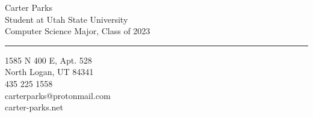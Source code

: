 \documentclass[12pt]{article}
\begin{document}
\sffamily

\begin{multicols}{2}
{ \Huge Carter Parks}\\

{\color{mainGray}
Student at Utah State University\\
Computer Science Major, Class of 2023
}
\vspace{14pt}
{\color{hrulegray}\hrule
}

\columnbreak

\begin{flushright}
{\small {}
{\color{mainGray}
1585 N 400 E, Apt. 528\\
North Logan, UT 84341\\
}
435\,\textbullet\,225\,\textbullet\,1558\\
carterparks@protonmail.com\\
carter-parks.net\\
}
\end{flushright}

\end{multicols}
\end{document}
